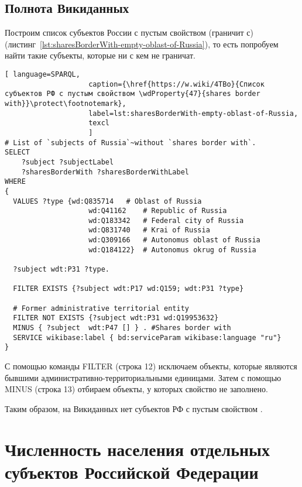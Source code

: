 \newpage
\subsection{Полнота Викиданных}

Построим список субъектов России с пустым свойством  (граничит с) (листинг~\protect\ref{lst:sharesBorderWith-empty-oblast-of-Russia}), то есть попробуем найти такие субъекты, которые ни с кем не граничат.

\lstset{numbers=left, firstnumber=1, frame=single}
\begin{lstlisting}[ language=SPARQL, 
                    caption={\href{https://w.wiki/4TBo}{Список субъектов РФ с пустым свойством \wdProperty{47}{shares border with}}\protect\footnotemark},
                    label=lst:sharesBorderWith-empty-oblast-of-Russia,
                    texcl 
                    ]
# List of `subjects of Russia`~without `shares border with`. 
SELECT 
    ?subject ?subjectLabel 
    ?sharesBorderWith ?sharesBorderWithLabel
WHERE
{
  VALUES ?type {wd:Q835714   # Oblast of Russia
                    wd:Q41162    # Republic of Russia
                    wd:Q183342   # Federal city of Russia
                    wd:Q831740   # Krai of Russia
                    wd:Q309166   # Autonomus oblast of Russia
                    wd:Q184122}  # Autonomus okrug of Russia
  
  ?subject wdt:P31 ?type.
  
  FILTER EXISTS {?subject wdt:P17 wd:Q159; wdt:P31 ?type}
  
  # Former administrative territorial entity
  FILTER NOT EXISTS {?subject wdt:P31 wd:Q19953632} 
  MINUS { ?subject  wdt:P47 [] } . #Shares border with 
  SERVICE wikibase:label { bd:serviceParam wikibase:language "ru"}
}
\end{lstlisting}%

С помощью команды FILTER (строка 12) исключаем объекты, которые являются бывшими административно-территориальными единицами. Затем с помощью MINUS (строка 13) отбираем объекты, у которых свойство  не заполнено.

Таким образом, на Викиданных нет субъектов РФ с пустым свойством .

\section{Численность населения отдельных субъектов Российской Федерации}


